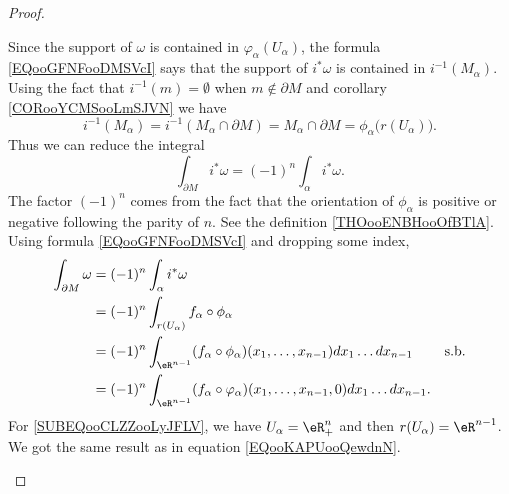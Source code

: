 \begin{proof}
\begin{subproof}
\begin{subproof}
			\spitem[On \( \partial M\)]
			Since the support of \( \omega\) is contained in \( \varphi_{\alpha}(U_{\alpha})\), the formula \eqref{EQooGFNFooDMSVcI} says that the support of \( i^*\omega\) is contained in \( i^{-1}(M_{\alpha})\). Using the fact that \( i^{-1}(m)=\emptyset\) when \( m\notin \partial M\) and corollary \ref{CORooYCMSooLmSJVN} we have
			\begin{equation}
				i^{-1}(M_{\alpha})=i^{-1}(M_{\alpha}\cap \partial M)=M_{\alpha}\cap\partial M=\phi_{\alpha}\big( r(U_{\alpha}) \big).
			\end{equation}
			Thus we can reduce the integral
			\begin{equation}
				\int_{\partial M}i^*\omega=(-1)^n\int_{\alpha}i^*\omega.
			\end{equation}
			The factor \( (-1)^n\) comes from the fact that the orientation of \( \phi_{\alpha}\) is positive or negative following the parity of \( n\). See the definition \ref{THOooENBHooOfBTlA}. Using formula \eqref{EQooGFNFooDMSVcI} and dropping some index,
			\begin{subequations}
				\begin{align}
					\int_{\partial M}\omega & = (-1)^n\int_{\alpha}i^*\omega                                                                                                              \\
					                        & =(-1)^n\int_{r(U_{\alpha})}f_{\alpha}\circ\phi_{\alpha}                                                                                     \\
					                        & =(-1)^n\int_{\eR^{n-1}}(f_{\alpha}\circ\phi_{\alpha})(x_1,\ldots,x_{n-1})dx_1\ldots dx_{n-1}       & \text{s.b.}		\label{SUBEQooCLZZooLyJFLV} \\
					                        & =(-1)^n\int_{\eR^{n-1}}(f_{\alpha}\circ\varphi_{\alpha})(x_1,\ldots,x_{n-1},0)dx_1\ldots dx_{n-1}.
				\end{align}
			\end{subequations}
			For \eqref{SUBEQooCLZZooLyJFLV}, we have \( U_{\alpha}=\eR^n_+\) and then \( r(U_{\alpha})=\eR^{n-1}\). We got the same result as in equation \eqref{EQooKAPUooQewdnN}.


\end{subproof}
\end{subproof}
\end{proof}
